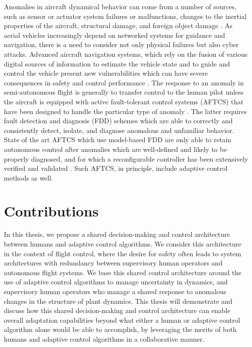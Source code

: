 Anomalies in aircraft dynamical behavior can come from a number of sources, such as sensor or actuator system failures or malfunctions, changes to the inertial properties of the aircraft, structural damage, and foreign object damage \cite{belcastro2016aircraft}. As aerial vehicles increasingly depend on networked systems for guidance and navigation, there is a need to consider not only physical failures but also cyber attacks. Advanced aircraft navigation systems, which rely on the fusion of various digital sources of information to estimate the vehicle state and to guide and control the vehicle present new vulnerabilities which can have severe consequences in safety and control performance \cite{kim2012cyber, kerns2014unmanned, kwon2014analysis, amin2009safe}. The response to an anomaly in semi-autonomous flight is generally to transfer control to the human pilot unless the aircraft is equipped with active fault-tolerant control systems (AFTCS) that have been designed to handle the particular type of anomaly \cite{zhang2008bibliographical}. The latter requires fault detection and diagnosis (FDD) schemes which are able to correctly and consistently detect, isolate, and diagnose anomalous and unfamiliar behavior. State of the art AFTCS which use model-based FDD are only able to retain autonomous control after anomalies which are well-defined and likely to be properly diagnosed, and for which a reconfigurable controller has been extensively verified and validated \cite{zhang2008bibliographical}. Such AFTCS, in principle, include adaptive control methods as well.

\section{Contributions}

In this thesis, we propose a shared decision-making and control architecture between humans and adaptive control algorithms. We consider this architecture in the context of flight control, where the desire for safety often leads to system architectures with redundancy between supervisory human operators and autonomous flight systems. We base this shared control architecture around the use of adaptive control algorithms to manage uncertainty in dynamics, and supervisory human operators who manage a shared response to anomalous changes in the structure of plant dynamics. This thesis will demonstrate and discuss how this shared decision-making and control architecture can enable overall adaptation capabilities beyond what either a human or adaptive control algorithm alone would be able to accomplish, by leveraging the merits of both humans and adaptive control algorithms in a collaborative manner. 

